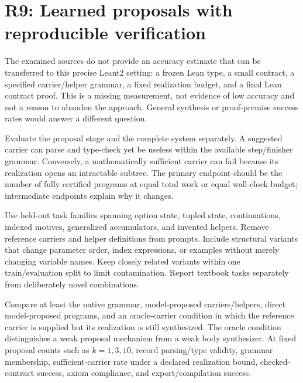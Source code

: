 \section{R9: Learned proposals with reproducible verification}\label{sec:learning}


\answer The examined sources do not provide an accuracy estimate that can be transferred to this precise Leant2 setting: a frozen Lean type, a small contract, a specified carrier/helper grammar, a fixed realization budget, and a final Lean contract proof. This is a missing measurement, not evidence of low accuracy and not a reason to abandon the approach. General synthesis or proof-premise success rates would answer a different question.

Evaluate the proposal stage and the complete system separately. A suggested carrier can parse and type-check yet be useless within the available step/finisher grammar. Conversely, a mathematically sufficient carrier can fail because its realization opens an intractable subtree. The primary endpoint should be the number of fully certified programs at equal total work or equal wall-clock budget; intermediate endpoints explain why it changes.

Use held-out task families spanning option state, tupled state, continuations, indexed motives, generalized accumulators, and invented helpers. Remove reference carriers and helper definitions from prompts. Include structural variants that change parameter order, index expressions, or examples without merely changing variable names. Keep closely related variants within one train/evaluation split to limit contamination. Report textbook tasks separately from deliberately novel combinations.

Compare at least the native grammar, model-proposed carriers/helpers, direct model-proposed programs, and an oracle-carrier condition in which the reference carrier is supplied but its realization is still synthesized. The oracle condition distinguishes a weak proposal mechanism from a weak body synthesizer. At fixed proposal counts such as $k=1,3,10$, record parsing/type validity, grammar membership, sufficient-carrier rate under a declared realization bound, checked-contract success, axiom compliance, and export/compilation success.

